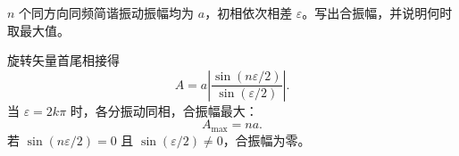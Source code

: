 \begin{exercise}[level=standard]
$n$ 个同方向同频简谐振动振幅均为 $a$，初相依次相差 $\varepsilon$。写出合振幅，并说明何时取最大值。
\begin{solution}
旋转矢量首尾相接得
\[
  A=a\left|\frac{\sin(n\varepsilon/2)}{\sin(\varepsilon/2)}\right|.
\]
当 $\varepsilon=2k\pi$ 时，各分振动同相，合振幅最大：
\[
  A_{\max}=na.
\]
若 $\sin(n\varepsilon/2)=0$ 且 $\sin(\varepsilon/2)\ne0$，合振幅为零。
\end{solution}
\end{exercise}


